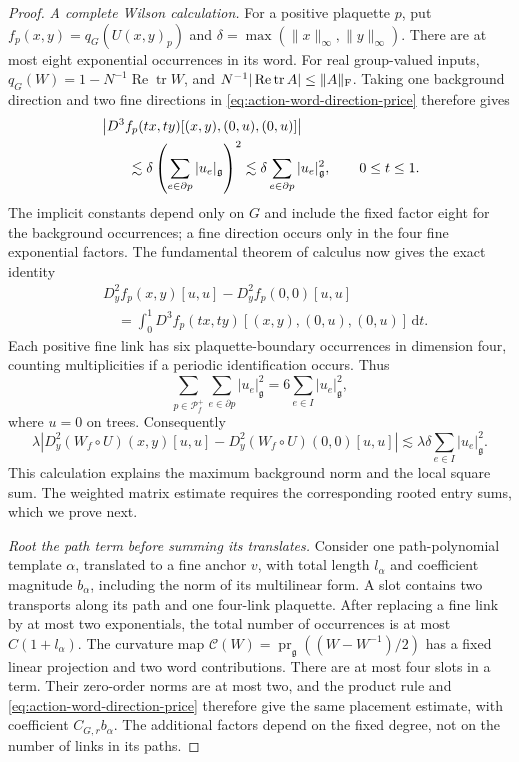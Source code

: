 \documentclass[11pt,reqno]{amsart}
\numberwithin{equation}{section}
\theoremstyle{definition}
\theoremstyle{remark}
\newcommand{\dd}{\mathrm d}
\newcommand{\g}{\mathfrak g}
\DeclareMathOperator{\tr}{tr}
\begin{document}
\begin{proof}
\smallskip\noindent
\emph{A complete Wilson calculation.}
For a positive plaquette \(p\), put
\(f_p(x,y)=q_G(U(x,y)_p)\) and
\(\delta=\max(\|x\|_\infty,\|y\|_\infty)\).
There are at most eight exponential occurrences in its word.
For real group-valued inputs,
\(q_G(W)=1-N^{-1}\operatorname{Re}\tr W\), and
\(N^{-1}|\operatorname{Re}\tr A|\le\|A\|_{\rm F}\).
Taking one background direction and two fine directions in
\eqref{eq:action-word-direction-price} therefore gives
\begin{align}
 &\left|D^3f_p(tx,ty)[(x,y),(0,u),(0,u)]\right|\notag\\
 &\qquad\lesssim\delta
              \left(\sum_{e\in\partial p}|u_e|_{\g}\right)^2
       \lesssim\delta\sum_{e\in\partial p}|u_e|_{\g}^2,
                       \qquad 0\le t\le1.
 \label{eq:action-Wilson-third-price}
\end{align}
The implicit constants depend only on \(G\) and include the
fixed factor eight for the background occurrences; a fine
direction occurs only in the four fine exponential factors. The fundamental theorem of
calculus now gives the exact identity
\begin{equation}
 \begin{split}
 &D_y^2f_p(x,y)[u,u]-D_y^2f_p(0,0)[u,u]\\
 &\quad=\int_0^1
       D^3f_p(tx,ty)[(x,y),(0,u),(0,u)]\,\dd t.
 \end{split}
 \label{eq:action-Wilson-Hessian-integral}
\end{equation}
Each positive fine link has six plaquette-boundary occurrences
in dimension four, counting multiplicities if a periodic
identification occurs. Thus
\[
 \sum_{p\in\mathcal P_f^+}\sum_{e\in\partial p}|u_e|_{\g}^2
                              =6\sum_{e\in I}|u_e|_{\g}^2,
\]
where \(u=0\) on trees. Consequently
\begin{equation}
 \lambda\left|D_y^2(W_f\circ U)(x,y)[u,u]
           -D_y^2(W_f\circ U)(0,0)[u,u]\right|
                    \lesssim\lambda\delta\sum_{e\in I}|u_e|_{\g}^2.
 \label{eq:action-Wilson-volume-bound}
\end{equation}
This calculation explains the maximum background norm and
the local square sum. The weighted matrix estimate requires
the corresponding rooted entry sums, which we prove next.

\smallskip\noindent
\emph{Root the path term before summing its translates.}
Consider one path-polynomial template \(\alpha\), translated
to a fine anchor \(v\), with total length \(l_\alpha\) and
coefficient magnitude \(b_\alpha\), including the norm of
its multilinear form. A slot contains two transports along
its path and one four-link plaquette. After replacing a
fine link by at most two exponentials, the total number of
occurrences is at most \(C(1+l_\alpha)\). The curvature map
\(\mathcal C(W)=\operatorname{pr}_{\g}((W-W^{-1})/2)\)
has a fixed linear projection and two word contributions.
There are at most four slots in a term. Their zero-order
norms are at most two, and the product rule and
\eqref{eq:action-word-direction-price} therefore give the
same placement estimate, with coefficient \(C_{G,r}b_\alpha\).
The additional factors depend on the fixed degree, not on
the number of links in its paths.


\end{proof}
\end{document}

